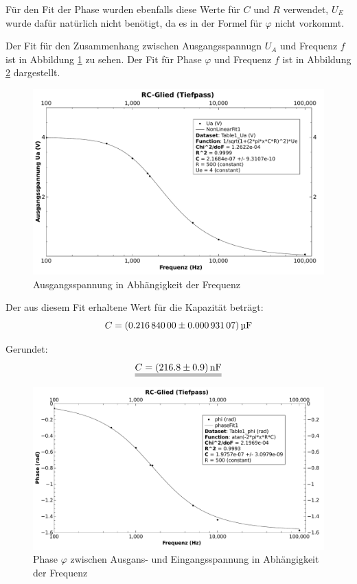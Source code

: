 F\"ur  den Fit  der  Phase wurden  ebenfalls  diese Werte  f\"ur  $C$ und  $R$
verwendet,  $U_E$ wurde  daf\"ur nat\"urlich  nicht ben\"otigt,  da es  in der
Formel f\"ur $\varphi$ nicht vorkommt.

Der Fit  f\"ur den Zusammenhang  zwischen Ausgangsspannugn $U_A$  und Frequenz
$f$  ist  in  Abbildung  \ref{fig:rcglied:spannung} zu  sehen. Der  Fit  f\"ur
Phase  $\varphi$ und  Frequenz  $f$ ist  in Abbildung  \ref{fig:rcglied:phase}
dargestellt.

\begin{figure}[th!]
    \centering
    \includegraphics[width=.8\textwidth]{images/aufgabe5-betrag.pdf}
    \caption{Ausgangsspannung in Abh\"angigkeit der Frequenz}
    \label{fig:rcglied:spannung}
\end{figure}

Der aus diesem Fit erhaltene Wert f\"ur die Kapazit\"at betr\"agt:
\begin{equation*}
    C = \SI[separate-uncertainty = true]{0.21684 \pm 0.00093107}{\micro\farad}
\end{equation*}

Gerundet:
\begin{equation*}
    \underline{\underline{C = \SI[separate-uncertainty = true]{216.8 \pm 0.9}{\nano\farad}}}
\end{equation*}

\begin{figure}[th!]
    \centering
    \includegraphics[width=.8\textwidth]{images/aufgabe5-phase.pdf}
    \caption{Phase $\varphi$ zwischen Ausgans- und Eingangsspannung in Abh\"angigkeit der Frequenz}
    \label{fig:rcglied:phase}
\end{figure}

